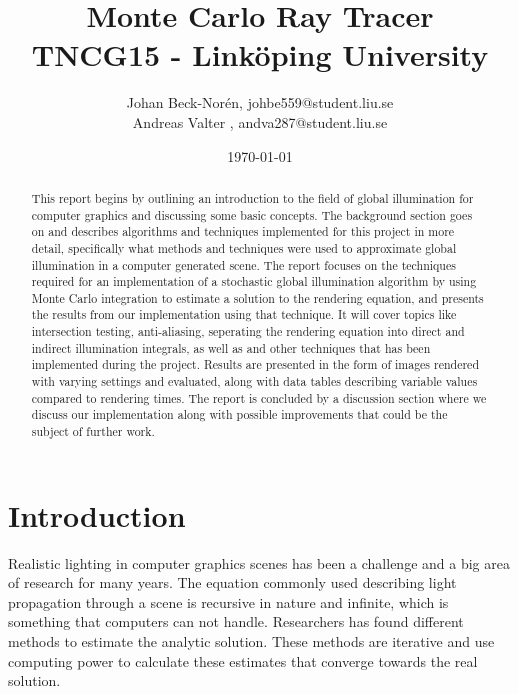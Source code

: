 \documentclass[a4paper, 12pt]{report}
\begin{document}
\title{\Huge{Monte Carlo Ray Tracer}\\[1.cm] \Large{TNCG15 - Link\"oping University} }   %
\author{
	Johan Beck-Nor\'{e}n, johbe559@student.liu.se
	\\Andreas Valter , andva287@student.liu.se
	}

\date{\today}    %
\maketitle

\setcounter{page}{2}
\begin{abstract}
This report begins by outlining an introduction to the field of global illumination for computer graphics and discussing some basic concepts.
The background section goes on and describes algorithms and techniques implemented for this project in more detail, specifically what methods and techniques were used to approximate global illumination in a computer generated scene.
The report focuses on the techniques required for an implementation of a stochastic global illumination algorithm by using Monte Carlo integration to estimate a solution to the rendering equation, and presents the results from our implementation using that technique.
It will cover topics like intersection testing, anti-aliasing, seperating the rendering equation into direct and indirect illumination integrals, as well as and other techniques that has been implemented during the project.
Results are presented in the form of images rendered with varying settings and evaluated, along with data tables describing variable values compared to rendering times.
The report is concluded by a discussion section where we discuss our implementation along with possible improvements that could be the subject of further work.
\end{abstract}

\tableofcontents


\chapter{Introduction} \label{ch:introduction}
Realistic lighting in computer graphics scenes has been a challenge and a big area of research for many years. 
The equation commonly used describing light propagation through a scene is recursive in nature and infinite, which is something that computers can not handle.
Researchers has found different methods to estimate the analytic solution.
These methods are iterative and use computing power to calculate these estimates that converge towards the real solution.\\
\end{document}
